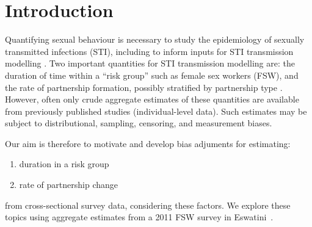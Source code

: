 \section{Introduction}
Quantifying sexual behaviour
is necessary to study the epidemiology of sexually transmitted infections (STI),
including to inform inputs for STI transmission modelling \cite{Fenton2001}.
Two important quantities for STI transmission modelling are:
the duration of time within a ``risk group'' such as female sex workers (FSW), and
the rate of partnership formation, possibly stratified by partnership type
\cite{Garnett1996,Stigum1997,Henry2015,Knight2020}.
However, often only crude aggregate estimates of these quantities are available
from previously published studies (\vs individual-level data).
Such estimates may be subject to
distributional, sampling, censoring, and measurement biases.
\par
Our aim is therefore to motivate and develop bias adjuments for estimating:
\begin{enumerate}
  \item duration in a risk group
  \item rate of partnership change
\end{enumerate}
from cross-sectional survey data, considering these factors.
We explore these topics using aggregate estimates from
a 2011 FSW survey in Eswatini~\cite{Baral2014}.
